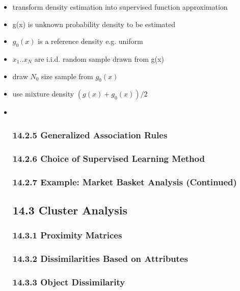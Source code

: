 \documentclass[11pt]{article}
\begin{document}
\begin{itemize}
\item
  transform density estimation into supervised function approximation
\item
  g(x) is unknown probability density to be estimated
\item
  \(g_{0}(x)\) is a reference density e.g. uniform
\item
  \(x_{1} ..x_{N}\) are i.i.d. random sample drawn from g(x)
\item
  draw \(N_{0}\) size sample from \(g_{0}(x)\)
\item
  use mixture density \((g(x)+g_{0}(x))/2\)
\item ~
  \subsubsection{14.2.5 Generalized Association
  Rules}\label{generalized-association-rules}

  \subsubsection{14.2.6 Choice of Supervised Learning
  Method}\label{choice-of-supervised-learning-method}

  \subsubsection{14.2.7 Example: Market Basket Analysis
  (Continued)}\label{example-market-basket-analysis-continued}

  \subsection{14.3 Cluster Analysis}\label{cluster-analysis}

  \subsubsection{14.3.1 Proximity Matrices}\label{proximity-matrices}

  \subsubsection{14.3.2 Dissimilarities Based on
  Attributes}\label{dissimilarities-based-on-attributes}

  \subsubsection{14.3.3 Object
  Dissimilarity}\label{object-dissimilarity}


\end{itemize}
\end{document}
